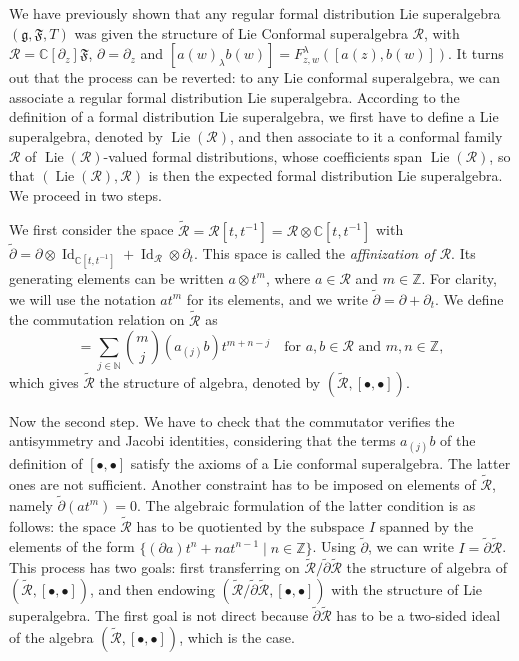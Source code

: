 \documentclass[a4paper, 12pt, reqno]{amsart}
\theoremstyle{remark}
\DeclareMathOperator{\Id}{Id}
\DeclareMathOperator{\Lie}{Lie}
\begin{document}
We have previously shown that any regular formal distribution Lie superalgebra $(\mathfrak{g}, \mathfrak{F}, T)$ was given the structure of Lie Conformal superalgebra $\mathcal{R}$, with $\mathcal{R} = \mathbb{C}[\partial_z]\mathfrak{F}$, $\partial = \partial_z$ and $[a(w)_{\lambda}b(w)] = F^{\lambda}_{z, w}([a(z), b(w)])$.
It turns out that the process can be reverted: to any Lie conformal superalgebra, we can associate a regular formal distribution Lie superalgebra.
According to the definition of a formal distribution Lie superalgebra, we first have to define a Lie superalgebra, denoted by $\Lie(\mathcal{R})$, and then associate to it a conformal family $\mathcal{R}$ of $\Lie(\mathcal{R})$-valued formal distributions, whose coefficients span $\Lie(\mathcal{R})$, so that $(\Lie(\mathcal{R}), \mathcal{R})$ is then the expected formal distribution Lie superalgebra.
We proceed in two steps.

We first consider the space $\widetilde{\mathcal{R}} = \mathcal{R}[t, t^{-1}] = \mathcal{R} \otimes \mathbb{C}[t, t^{-1}]$ with $\widetilde{\partial} = \partial\otimes\Id_{\mathbb{C}[t, t^{-1}]} + \Id_{\mathcal{R}}\otimes\partial_t$.
This space is called the \emph{affinization of $\mathcal{R}$}.
Its generating elements can be written $a\otimes t^m$, where $a \in \mathcal{R}$ and $m \in \mathbb{Z}$.
For clarity, we will use the notation $at^m$ for its elements, and we write $\widetilde{\partial} = \partial + \partial_t$.
We define the commutation relation on $\widetilde{\mathcal{R}}$ as
\begin{equation*}
  [at^m, bt^n] = \sum_{j \in \mathbb{N}}\binom{m}{j}(a_{(j)}b)t^{m + n - j} \quad \text{for $a, b \in \mathcal{R}$ and $m, n \in \mathbb{Z}$},
\end{equation*}
which gives $\widetilde{\mathcal{R}}$ the structure of algebra, denoted by $(\widetilde{\mathcal{R}},[\bullet, \bullet])$.

Now the second step.
We have to check that the commutator verifies the antisymmetry and Jacobi identities, considering that the terms $a_{(j)}b$ of the definition of $[\bullet, \bullet]$ satisfy the axioms of a Lie conformal superalgebra.
The latter ones are not sufficient.
Another constraint has to be imposed on elements of $\widetilde{\mathcal{R}}$, namely $\widetilde{\partial}(at^m) = 0$.
The algebraic formulation of the latter condition is as follows: the space $\widetilde{\mathcal{R}}$ has to be quotiented by the subspace $I$ spanned by the elements of the form $\{(\partial a)t^n + nat^{n - 1} \mid n \in \mathbb{Z}\}$.
Using $\widetilde{\partial}$, we can write $I = \widetilde{\partial}\widetilde{\mathcal{R}}$.
This process has two goals: first transferring on $\widetilde{\mathcal{R}}/\widetilde{\partial}\widetilde{\mathcal{R}}$ the structure of algebra of $(\widetilde{\mathcal{R}}, [\bullet, \bullet])$, and then endowing $(\widetilde{\mathcal{R}}/\widetilde{\partial}\widetilde{\mathcal{R}}, [\bullet, \bullet])$ with the structure of Lie superalgebra.
The first goal is not direct because $\widetilde{\partial}\widetilde{\mathcal{R}}$ has to be a two-sided ideal of the algebra $(\widetilde{\mathcal{R}}, [\bullet, \bullet])$, which is the case.
\end{document}
